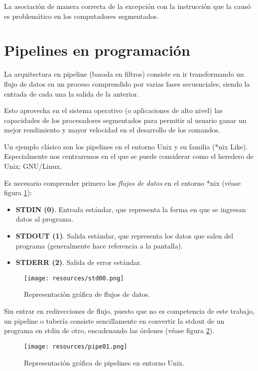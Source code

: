 \documentclass[a4paper, 11pt, titlepage]{article}
\begin{document}
            La asociación de manera correcta de la excepción con la instrucción que la causó es problemático en los computadores segmentados.

\section{Pipelines en programación}

    La arquitectura en pipeline (basada en filtros) consiste en ir transformando un flujo de datos en un proceso comprendido por varias fases 
    secuenciales, siendo la entrada de cada una la salida de la anterior. 

    Esto aprovecha en el sistema operativo (o aplicaciones de alto nivel) las capacidades de los procesadores segmentados para permitir 
    al usuario ganar un mejor rendimiento y mayor velocidad en el desarrollo de los comandos. 

    Un ejemplo clásico son los pipelines en el entorno Unix y su familia (*nix Like). Especialmente nos centraremos en 
    el que se puede considerar como el heredero de Unix; GNU/Linux.

    Es necesario comprender primero los \textit{flujos de datos} en el entorno *nix (véase figura \ref{std00}):

    \begin{itemize}
        \item \textbf{STDIN (0)}. Entrada estándar, que representa la forma en que se ingresan datos al programa.
        \item \textbf{STDOUT (1)}. Salida estándar, que representa los datos que salen del programa (generalmente hace referencia a la pantalla).
        \item \textbf{STDERR (2)}. Salida de error estándar.
    \end{itemize}

    \begin{figure}[htp]
        \centering
        \texttt{[image: resources/std00.png]}
        \caption{Representación gráfica de flujos de datos.}
        \label{std00}
    \end{figure}

    Sin entrar en redirecciones de flujo, puesto que no es competencia de este trabajo, un pipeline o tubería consiste
    sencillamente en convertir la stdout de un programa en stdin de otro, encadenando las órdenes (véase figura \ref{pipe01}).

    \begin{figure}[htp]
        \centering
        \texttt{[image: resources/pipe01.png]}
        \caption{Representación gráfica de pipelines en entorno Unix.}
        \label{pipe01}
    \end{figure}
\end{document}
